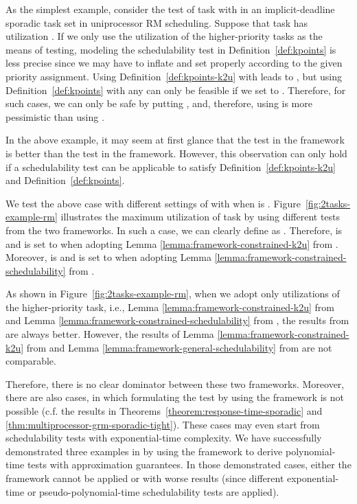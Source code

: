 \documentclass[10pt,conference]{IEEEtran}
\newcommand{\frameworkkq}[1]{}
\newcommand{\frameworkku}[1]{}
\begin{document}
As the simplest example, consider the test of task  with
 in an implicit-deadline sporadic task set in uniprocessor RM scheduling. Suppose that task
 has utilization . If we only use the utilization of
the higher-priority tasks as the means of testing, modeling the
schedulability test in Definition~\ref{def:kpoints} is less precise
since we may have to inflate and set  properly according to the
given priority assignment. Using Definition~\ref{def:kpoints-k2u} with
 leads to , but using Definition~\ref{def:kpoints}
with any  can only be feasible if we set  to
. Therefore, for such cases, we can only be safe by putting , and, therefore, using \frameworkkq{} is more pessimistic
than using \frameworkku{}.

In the above example, it may seem at first glance that the test in the
\frameworkku{} framework is better than the test in the \frameworkkq{}
framework. However, this observation can only hold if a
schedulability test can be applicable to satisfy
Definition~\ref{def:kpoints-k2u} and Definition~\ref{def:kpoints}.

We test the above case with different settings of 
with  when  is
. Figure~\ref{fig:2tasks-example-rm} illustrates the maximum
utilization of task  by using different tests from the two
frameworks. In such a case, we can clearly define  as
. Therefore,  is 
and  is set to  when
adopting Lemma \ref{lemma:framework-constrained-k2u} from
\frameworkku{}. Moreover,  is  and  is set to
 when adopting Lemma
\ref{lemma:framework-constrained-schedulability} from \frameworkkq{}.

As shown in Figure~\ref{fig:2tasks-example-rm}, when we adopt only
utilizations of the higher-priority task, i.e., Lemma
\ref{lemma:framework-constrained-k2u} from \frameworkku{} and Lemma
\ref{lemma:framework-constrained-schedulability} from \frameworkkq{},
the results from \frameworkku{} are always better. However, the results
of Lemma \ref{lemma:framework-constrained-k2u} from \frameworkku{} and
Lemma \ref{lemma:framework-general-schedulability} from \frameworkkq{}
are not comparable. 

Therefore, there is no clear dominator between these two frameworks.
Moreover, there are also cases, in which formulating the test by using
the \frameworkku{} framework is not possible (c.f. the results in
Theorems~\ref{theorem:response-time-sporadic} and
\ref{thm:multiprocessor-grm-sporadic-tight}). These cases may even
start from schedulability tests with exponential-time complexity. We
have successfully demonstrated three examples in
\cite{DBLP:journals/corr/abs-kRTA} by using the \frameworkkq{} framework
to derive polynomial-time tests with approximation guarantees. In
those demonstrated cases, either the \frameworkku{} framework cannot
be applied or with worse results (since different exponential-time or
pseudo-polynomial-time schedulability tests are applied).
\end{document}
